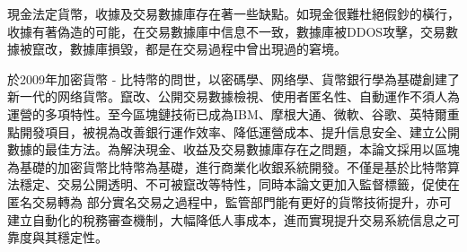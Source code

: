 

現金法定貨幣，收據及交易數據庫存在著一些缺點。如現金很難杜絕假鈔的橫行，收據有著偽造的可能，在交易數據庫中信息不一致，數據庫被DDOS攻擊，交易數據被竄改，數據庫損毀，都是在交易過程中曾出現過的窘境。

於2009年加密貨幣 - 比特幣的問世，以密碼學、网络學、貨幣銀行學為基礎創建了新一代的网络貨幣。竄改、公開交易數據檢視、使用者匿名性、自動運作不須人為運營的多項特性。至今區塊鏈技術已成為IBM、摩根大通、微軟、谷歌、英特爾重點開發項目，被視為改善銀行運作效率、降低運營成本、提升信息安全、建立公開數據的最佳方法。為解決現金、收益及交易數據庫存在之問題，本論文採用以區塊為基礎的加密貨幣比特幣為基礎，進行商業化收銀系統開發。不僅是基於⽐特幣算法穩定、交易公開透明、不可被竄改等特性，同時本論⽂更加⼊監督標籤，促使在匿名交易轉為
部分實名交易之過程中，監管部⾨能有更好的貨幣技術提升，亦可建立自動化的稅務審查機制，大幅降低人事成本，進而實現提升交易系統信息之可靠度與其穩定性。
